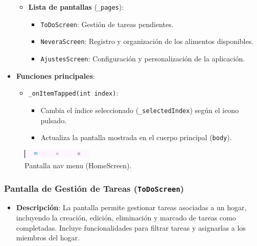 \documentclass{article}
\begin{document}
\begin{flushleft}
\begin{itemize}
\begin{itemize}
\begin{itemize}
        \end{itemize}
        \item \textbf{Lista de pantallas} (\texttt{\_pages}):
        \begin{itemize}
            \item \texttt{ToDoScreen}: Gestión de tareas pendientes.
            \item \texttt{NeveraScreen}: Registro y organización de los alimentos disponibles.
            \item \texttt{AjustesScreen}: Configuración y personalización de la aplicación.
        \end{itemize}
    \end{itemize}

    \item \textbf{Funciones principales}:
    \begin{itemize}
        \item \texttt{\_onItemTapped(int index)}:
        \begin{itemize}
            \item Cambia el índice seleccionado (\texttt{\_selectedIndex}) según el icono pulsado.
            \item Actualiza la pantalla mostrada en el cuerpo principal (\texttt{body}).
        \end{itemize}
    \end{itemize}
\end{itemize}

\begin{figure}[H]
    \centering
    \includegraphics[width=0.3\textwidth]{TFG/img/img/nav.png}

    \caption{Pantalla nav menu (HomeScreen).}
    \label{fig:home_screen}
\end{figure}




     \clearpage

\subsubsection{Pantalla de Gesti\'on de Tareas (\texttt{ToDoScreen})}
\begin{itemize}
    \item \textbf{Descripci\'on}: 
    La pantalla permite gestionar tareas asociadas a un hogar, incluyendo la creaci\'on, edici\'on, eliminaci\'on y marcado de tareas como completadas. Incluye funcionalidades para filtrar tareas y asignarlas a los miembros del hogar.


\end{itemize}
\end{flushleft}
\end{document}
